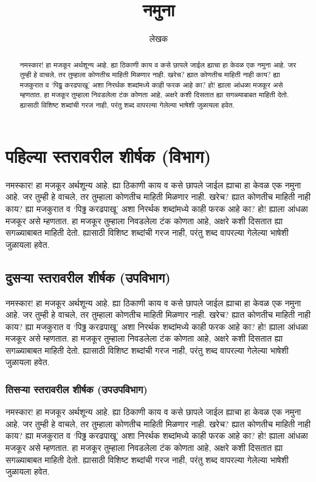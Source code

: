 \title{नमुना}
\author{लेखक}
\maketitle
\begin{abstract}
नमस्कार! हा मजकूर अर्थशून्य आहे. ह्या ठिकाणी काय व कसे छापले जाईल ह्याचा हा केवळ एक नमुना आहे. जर तुम्ही हे वाचले, तर तुम्हाला कोणतीच माहिती मिळणार नाही. खरेच? ह्यात कोणतीच माहिती नाही काय? ह्या मजकुरात व `पिढ्ढ करढपाखू' अशा निरर्थक शब्दांमध्ये काही फरक आहे का? हो! ह्याला आंधळा मजकूर असे म्हणतात. हा मजकूर तुम्हाला निवडलेला टंक कोणता आहे, अक्षरे कशी दिसतात ह्या सगळ्याबाबत माहिती देतो. ह्यासाठी विशिष्ट शब्दांची गरज नाही, परंतु शब्द वापरल्या गेलेल्या भाषेशी जुळायला हवेत.
\end{abstract}
\tableofcontents
\section{पहिल्या स्तरावरील शीर्षक (विभाग)}
नमस्कार! हा मजकूर अर्थशून्य आहे. ह्या ठिकाणी काय व कसे छापले जाईल ह्याचा हा केवळ एक नमुना आहे. जर तुम्ही हे वाचले, तर तुम्हाला कोणतीच माहिती मिळणार नाही. खरेच? ह्यात कोणतीच माहिती नाही काय? ह्या मजकुरात व `पिढ्ढ करढपाखू' अशा निरर्थक शब्दांमध्ये काही फरक आहे का? हो! ह्याला आंधळा मजकूर असे म्हणतात. हा मजकूर तुम्हाला निवडलेला टंक कोणता आहे, अक्षरे कशी दिसतात ह्या सगळ्याबाबत माहिती देतो. ह्यासाठी विशिष्ट शब्दांची गरज नाही, परंतु शब्द वापरल्या गेलेल्या भाषेशी जुळायला हवेत.
\subsection{दुसऱ्या स्तरावरील शीर्षक (उपविभाग)}
नमस्कार! हा मजकूर अर्थशून्य आहे. ह्या ठिकाणी काय व कसे छापले जाईल ह्याचा हा केवळ एक नमुना आहे. जर तुम्ही हे वाचले, तर तुम्हाला कोणतीच माहिती मिळणार नाही. खरेच? ह्यात कोणतीच माहिती नाही काय? ह्या मजकुरात व `पिढ्ढ करढपाखू' अशा निरर्थक शब्दांमध्ये काही फरक आहे का? हो! ह्याला आंधळा मजकूर असे म्हणतात. हा मजकूर तुम्हाला निवडलेला टंक कोणता आहे, अक्षरे कशी दिसतात ह्या सगळ्याबाबत माहिती देतो. ह्यासाठी विशिष्ट शब्दांची गरज नाही, परंतु शब्द वापरल्या गेलेल्या भाषेशी जुळायला हवेत.
\subsubsection{तिसऱ्या स्तरावरील शीर्षक (उपउपविभाग)}
नमस्कार! हा मजकूर अर्थशून्य आहे. ह्या ठिकाणी काय व कसे छापले जाईल ह्याचा हा केवळ एक नमुना आहे. जर तुम्ही हे वाचले, तर तुम्हाला कोणतीच माहिती मिळणार नाही. खरेच? ह्यात कोणतीच माहिती नाही काय? ह्या मजकुरात व `पिढ्ढ करढपाखू' अशा निरर्थक शब्दांमध्ये काही फरक आहे का? हो! ह्याला आंधळा मजकूर असे म्हणतात. हा मजकूर तुम्हाला निवडलेला टंक कोणता आहे, अक्षरे कशी दिसतात ह्या सगळ्याबाबत माहिती देतो. ह्यासाठी विशिष्ट शब्दांची गरज नाही, परंतु शब्द वापरल्या गेलेल्या भाषेशी जुळायला हवेत.
